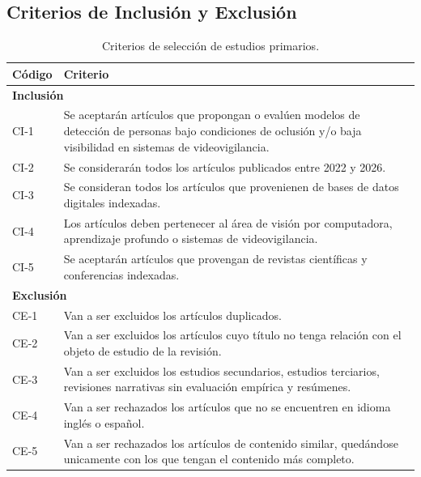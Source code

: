 \documentclass[12pt, a4paper]{article}
\begin{document}
\subsection{Criterios de Inclusi\'{o}n y Exclusi\'{o}n}

\begin{table}[H]
\centering
\caption{Criterios de selecci\'{o}n de estudios primarios.}
\label{tab:criterios}
\begin{tabularx}{\linewidth}{lX}
\toprule
\textbf{C\'{o}digo} & \textbf{Criterio} \\
\midrule
\multicolumn{2}{l}{\cellcolor{azulClaro!40}\textbf{Inclusi\'{o}n}} \\
CI-1 & Se aceptar\'{a}n art\'{i}culos que propongan o eval\'{u}en modelos
       de detecci\'{o}n de personas bajo condiciones de oclusi\'{o}n y/o
       baja visibilidad en sistemas de videovigilancia. \\
CI-2 & Se considerar\'{a}n todos los art\'{i}culos publicados entre
       2022 y 2026. \\
CI-3 & Se consideran todos los art\'{i}culos que provenienen de bases de
       datos digitales indexadas. \\
CI-4 & Los art\'{i}culos deben pertenecer al \'{a}rea de visi\'{o}n por
       computadora, aprendizaje profundo o sistemas de videovigilancia. \\
CI-5 & Se aceptar\'{a}n art\'{i}culos que provengan de revistas
       cient\'{i}ficas y conferencias indexadas. \\
\midrule
\multicolumn{2}{l}{\cellcolor{red!10}\textbf{Exclusi\'{o}n}} \\
CE-1 & Van a ser excluidos los art\'{i}culos duplicados. \\
CE-2 & Van a ser excluidos los art\'{i}culos cuyo t\'{i}tulo no tenga
       relaci\'{o}n con el objeto de estudio de la revisi\'{o}n. \\
CE-3 & Van a ser excluidos los estudios secundarios, estudios terciarios,
       revisiones narrativas sin evaluaci\'{o}n emp\'{i}rica y
       res\'{u}menes. \\
CE-4 & Van a ser rechazados los art\'{i}culos que no se encuentren en
       idioma ingl\'{e}s o espa\~{n}ol. \\
CE-5 & Van a ser rechazados los art\'{i}culos de contenido similar,
       qued\'{a}ndose unicamente con los que tengan el contenido m\'{a}s
       completo. \\
\bottomrule
\end{tabularx}
\end{table}
\end{document}
